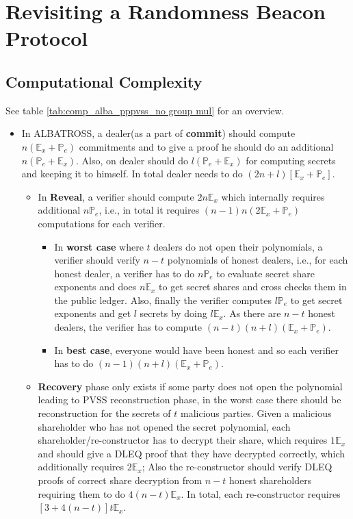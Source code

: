\chapter{Revisiting a Randomness Beacon Protocol}
\label{cha:n}

\section{Computational Complexity}

See table \ref{tab:comp_alba_pppvss_no group mul} for an overview.
\begin{itemize}
    \item In ALBATROSS, a dealer(as a part of \textbf{commit}) should compute $n(\mathbb{E}_x+\mathbb{P}_e)$ commitments and to give a proof he should do an additional $n(\mathbb{P}_{e}+\mathbb{E}_{x})$. Also, on dealer should do $l(\mathbb{P}_e+\mathbb{E}_x)$ for computing secrets and keeping it to himself. In total dealer needs to do $(2n+l)[\mathbb{E}_x+\mathbb{P}_{e}]$.
        \begin{itemize}
            \item In \textbf{Reveal}, a verifier should compute $2n\mathbb{E}_{x}$ which internally requires additional $n\mathbb{P}_{e}$, i.e., in total it requires $(n-1)n(2\mathbb{E}_{x}+\mathbb{P}_{e})$ computations for each verifier.
            \begin{itemize}
                \item In \textbf{worst case} where $t$ dealers do not open their polynomials, a verifier should verify $n-t$ polynomials of honest dealers, i.e., for each honest dealer, a verifier has to do $n\mathbb{P}_e$ to evaluate secret share exponents and does $n\mathbb{E}_x$ to get secret shares and cross checks them in the public ledger. Also, finally the verifier computes $l\mathbb{P}_e$ to get secret exponents and get $l$ secrets by doing $l\mathbb{E}_x$. As there are $n-t$ honest dealers, the verifier has to compute $(n-t)(n+l)(\mathbb{E}_x+\mathbb{P}_e)$.
                \item  In \textbf{best case}, everyone would have been honest and so each verifier has to do $(n-1)(n+l)(\mathbb{E}_x+\mathbb{P}_e)$.
            \end{itemize}
            \item \textbf{Recovery} phase only exists if some party does not open the polynomial leading to PVSS reconstruction phase, in the worst case there should be reconstruction for the secrets of $t$ malicious parties. Given a malicious shareholder who has not opened the secret polynomial, each shareholder/re-constructor has to decrypt their share, which requires $1\mathbb{E}_{x}$ and should give a DLEQ proof that they have decrypted correctly, which additionally requires $2\mathbb{E}_x$; Also the re-constructor should verify DLEQ proofs of correct share decryption from $n-t$ honest shareholders requiring them to do $4(n-t)\mathbb{E}_{x}$. In total, each re-constructor requires $[3+4(n-t)]t\mathbb{E}_{x}$.

\end{itemize}
\end{itemize}
